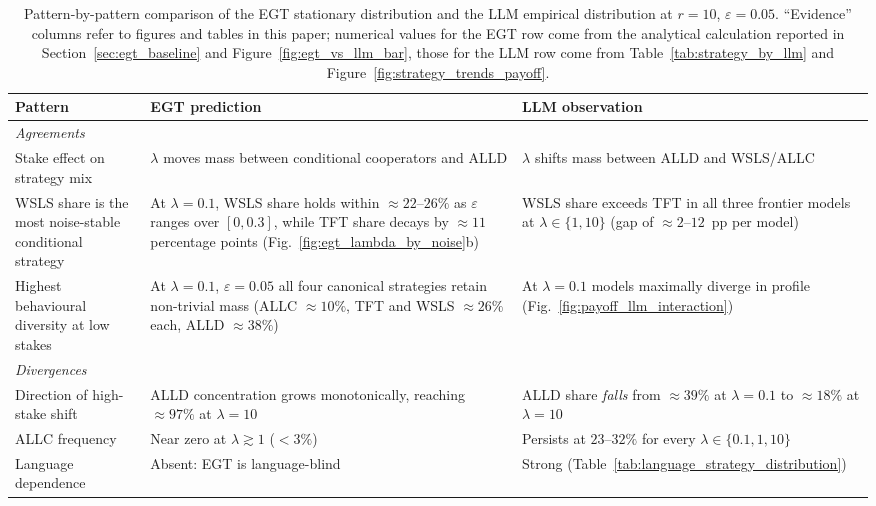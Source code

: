 \documentclass[a4paper,fleqn]{cas-sc}
\begin{document}
\begin{table}[pos=H]
\centering
\caption{Pattern-by-pattern comparison of the EGT stationary distribution and the LLM empirical distribution at $r{=}10$, $\varepsilon{=}0.05$. ``Evidence'' columns refer to figures and tables in this paper; numerical values for the EGT row come from the analytical calculation reported in Section~\ref{sec:egt_baseline} and Figure~\ref{fig:egt_vs_llm_bar}, those for the LLM row come from Table~\ref{tab:strategy_by_llm} and Figure~\ref{fig:strategy_trends_payoff}.}
\label{tab:egt_vs_llm_summary}
\footnotesize
\begin{tabularx}{\linewidth}{XXX}
\toprule
\textbf{Pattern} & \textbf{EGT prediction} & \textbf{LLM observation} \\
\midrule
\multicolumn{3}{l}{\emph{Agreements}}\\
\midrule
Stake effect on strategy mix & $\lambda$ moves mass between conditional cooperators and ALLD & $\lambda$ shifts mass between ALLD and WSLS/ALLC \\
WSLS share is the most noise-stable conditional strategy & At $\lambda{=}0.1$, WSLS share holds within $\approx 22$--$26\%$ as $\varepsilon$ ranges over $[0, 0.3]$, while TFT share decays by $\approx 11$ percentage points (Fig.~\ref{fig:egt_lambda_by_noise}b) & WSLS share exceeds TFT in all three frontier models at $\lambda \in \{1, 10\}$ (gap of $\approx 2$--$12$~pp per model) \\
Highest behavioural diversity at low stakes & At $\lambda{=}0.1$, $\varepsilon{=}0.05$ all four canonical strategies retain non-trivial mass (ALLC $\approx 10\%$, TFT and WSLS $\approx 26\%$ each, ALLD $\approx 38\%$) & At $\lambda{=}0.1$ models maximally diverge in profile (Fig.~\ref{fig:payoff_llm_interaction}) \\
\midrule
\multicolumn{3}{l}{\emph{Divergences}}\\
\midrule
Direction of high-stake shift & ALLD concentration grows monotonically, reaching $\approx 97\%$ at $\lambda{=}10$ & ALLD share \emph{falls} from $\approx 39\%$ at $\lambda{=}0.1$ to $\approx 18\%$ at $\lambda{=}10$ \\
ALLC frequency & Near zero at $\lambda \gtrsim 1$ ($< 3\%$) & Persists at $23$--$32\%$ for every $\lambda \in \{0.1, 1, 10\}$ \\
Language dependence & Absent: EGT is language-blind & Strong (Table~\ref{tab:language_strategy_distribution}) \\
\bottomrule
\end{tabularx}
\end{table}
\end{document}
